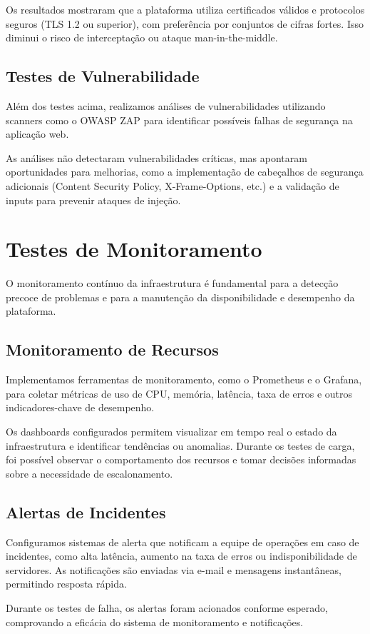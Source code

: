 Os resultados mostraram que a plataforma utiliza certificados válidos e protocolos seguros (TLS 1.2 ou superior), com preferência por conjuntos de cifras fortes. Isso diminui o risco de interceptação ou ataque man-in-the-middle.

\subsection{Testes de Vulnerabilidade}

Além dos testes acima, realizamos análises de vulnerabilidades utilizando scanners como o OWASP ZAP para identificar possíveis falhas de segurança na aplicação web.

As análises não detectaram vulnerabilidades críticas, mas apontaram oportunidades para melhorias, como a implementação de cabeçalhos de segurança adicionais (Content Security Policy, X-Frame-Options, etc.) e a validação de inputs para prevenir ataques de injeção.

\section{Testes de Monitoramento}

O monitoramento contínuo da infraestrutura é fundamental para a detecção precoce de problemas e para a manutenção da disponibilidade e desempenho da plataforma.

\subsection{Monitoramento de Recursos}

Implementamos ferramentas de monitoramento, como o Prometheus e o Grafana, para coletar métricas de uso de CPU, memória, latência, taxa de erros e outros indicadores-chave de desempenho.

Os dashboards configurados permitem visualizar em tempo real o estado da infraestrutura e identificar tendências ou anomalias. Durante os testes de carga, foi possível observar o comportamento dos recursos e tomar decisões informadas sobre a necessidade de escalonamento.

\subsection{Alertas de Incidentes}

Configuramos sistemas de alerta que notificam a equipe de operações em caso de incidentes, como alta latência, aumento na taxa de erros ou indisponibilidade de servidores. As notificações são enviadas via e-mail e mensagens instantâneas, permitindo resposta rápida.

Durante os testes de falha, os alertas foram acionados conforme esperado, comprovando a eficácia do sistema de monitoramento e notificações.


